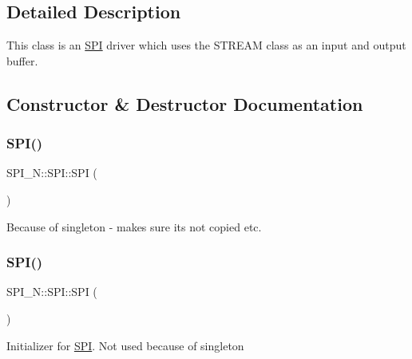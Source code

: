 \subsection{Detailed Description}
This class is an \hyperlink{class_s_p_i___n_1_1_s_p_i}{S\+PI} driver which uses the S\+T\+R\+E\+AM class as an input and output buffer. 

\subsection{Constructor \& Destructor Documentation}
\hypertarget{class_s_p_i___n_1_1_s_p_i_ab486ba0f0d9ec880520e568762cc6c7d}{}\label{class_s_p_i___n_1_1_s_p_i_ab486ba0f0d9ec880520e568762cc6c7d} 
\subsubsection{\texorpdfstring{S\+P\+I()}{SPI()}\hspace{0.1cm}{\footnotesize\ttfamily [1/2]}}
{\footnotesize\ttfamily S\+P\+I\+\_\+\+N\+::\+S\+P\+I\+::\+S\+PI (\begin{DoxyParamCaption}\item[{const \hyperlink{class_s_p_i___n_1_1_s_p_i}{S\+PI} \&}]{ }\end{DoxyParamCaption})\hspace{0.3cm}{\ttfamily [delete]}}

Because of singleton -\/ makes sure its not copied etc. \hypertarget{class_s_p_i___n_1_1_s_p_i_a8fec1a6e642a5758acf974b92e28a9e6}{}\label{class_s_p_i___n_1_1_s_p_i_a8fec1a6e642a5758acf974b92e28a9e6} 
\subsubsection{\texorpdfstring{S\+P\+I()}{SPI()}\hspace{0.1cm}{\footnotesize\ttfamily [2/2]}}
{\footnotesize\ttfamily S\+P\+I\+\_\+\+N\+::\+S\+P\+I\+::\+S\+PI (\begin{DoxyParamCaption}{ }\end{DoxyParamCaption})\hspace{0.3cm}{\ttfamily [private]}}

Initializer for \hyperlink{class_s_p_i___n_1_1_s_p_i}{S\+PI}. Not used because of singleton 

